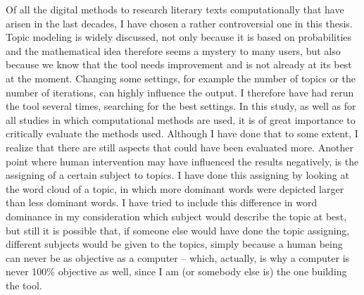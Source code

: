 Of all the digital methods to research literary texts computationally that have arisen in the last decades, I have chosen a rather controversial one in this thesis. Topic modeling is widely discussed, not only because it is based on probabilities and the mathematical idea therefore seems a mystery to many users, but also because we know that the tool needs improvement and is not already at its best at the moment. Changing some settings, for example the number of topics or the number of iterations, can highly influence the output. I therefore have had rerun the tool several times, searching for the best settings. In this study, as well as for all studies in which computational methods are used, it is of great importance to critically evaluate the methods used. Although I have done that to some extent, I realize that there are still aspects that could have been evaluated more. Another point where human intervention may have influenced the results negatively, is the assigning of a certain subject to topics. I have done this assigning by looking at the word cloud of a topic, in which more dominant words were depicted larger than less dominant words. I have tried to include this difference in word dominance in my consideration which subject would describe the topic at best, but still it is possible that, if someone else would have done the topic assigning, different subjects would be given to the topics, simply because a human being can never be as objective as a computer -- which, actually, is why a computer is never 100\% objective as well, since I am (or somebody else is) the one building the tool.

